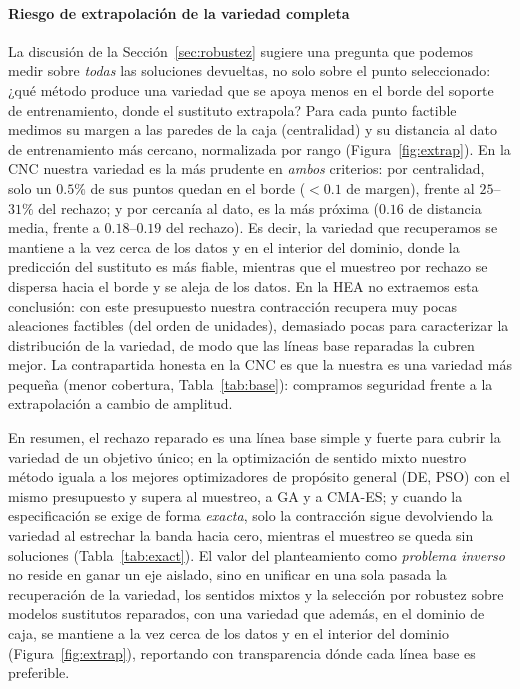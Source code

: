 \documentclass[5p,times,authoryear]{elsarticle}
\begin{document}
\paragraph{Riesgo de extrapolación de la variedad completa} La discusión de la
Sección~\ref{sec:robustez} sugiere una pregunta que podemos medir sobre \emph{todas}
las soluciones devueltas, no solo sobre el punto seleccionado: ¿qué método produce una
variedad que se apoya menos en el borde del soporte de entrenamiento, donde el sustituto
extrapola? Para cada punto factible medimos su margen a las paredes de la caja
(centralidad) y su distancia al dato de entrenamiento más cercano, normalizada por rango
(Figura~\ref{fig:extrap}). En la CNC nuestra variedad es la más prudente en \emph{ambos}
criterios: por centralidad, solo un $0.5\%$ de sus puntos quedan en el borde ($<0.1$ de
margen), frente al $25$--$31\%$ del rechazo; y por cercanía al dato, es la más próxima
($0.16$ de distancia media, frente a $0.18$--$0.19$ del rechazo). Es decir, la variedad que
recuperamos se mantiene a la vez cerca de los datos y en el interior del dominio, donde la
predicción del sustituto es más fiable, mientras que el muestreo por rechazo se dispersa
hacia el borde y se aleja de los datos. En la HEA no extraemos esta conclusión: con este
presupuesto nuestra contracción recupera muy pocas aleaciones factibles (del orden de unidades),
demasiado pocas para caracterizar la distribución de la variedad, de modo que las líneas base
reparadas la cubren mejor. La contrapartida honesta en la CNC es que la nuestra es una variedad
más pequeña (menor cobertura, Tabla~\ref{tab:base}): compramos seguridad frente a la
extrapolación a cambio de amplitud.

En resumen, el rechazo reparado es una línea base simple y fuerte para cubrir la
variedad de un objetivo único; en la optimización de sentido mixto nuestro método iguala a
los mejores optimizadores de propósito general (DE, PSO) con el mismo presupuesto y supera
al muestreo, a GA y a CMA-ES; y cuando la especificación se exige de forma \emph{exacta},
solo la contracción sigue devolviendo la variedad al estrechar la banda hacia cero, mientras
el muestreo se queda sin soluciones (Tabla~\ref{tab:exact}). El valor del planteamiento como \emph{problema inverso} no
reside en ganar un eje aislado, sino en unificar en una sola pasada la recuperación de la
variedad, los sentidos mixtos y la selección por robustez sobre modelos sustitutos
reparados, con una variedad que además, en el dominio de caja, se mantiene a la vez cerca de
los datos y en el interior del dominio (Figura~\ref{fig:extrap}), reportando con transparencia
dónde cada línea base es preferible.
\end{document}
